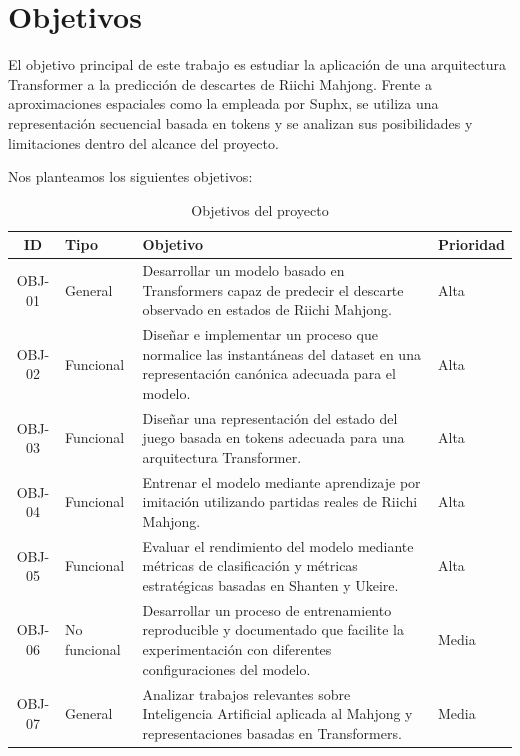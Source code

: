 \section{Objetivos}

El objetivo principal de este trabajo es estudiar la aplicación de una arquitectura Transformer a la predicción de descartes de Riichi Mahjong. Frente a aproximaciones espaciales como la empleada por Suphx\cite{li2020suphx}, se utiliza una representación secuencial basada en tokens y se analizan sus posibilidades y limitaciones dentro del alcance del proyecto.

Nos planteamos los siguientes objetivos:

\begin{table}[H]
\centering
\caption{Objetivos del proyecto}
\label{tab:objetivos}

\begin{tabular}{@{}cl p{8cm} l@{}}
\toprule
\textbf{ID} & \textbf{Tipo} & \textbf{Objetivo} & \textbf{Prioridad} \\
\midrule

OBJ-01 & General &
Desarrollar un modelo basado en Transformers capaz de predecir el descarte observado en estados de Riichi Mahjong. &
Alta \\

OBJ-02 & Funcional &
Diseñar e implementar un proceso que normalice las instantáneas del dataset en una representación canónica adecuada para el modelo. &
Alta \\

OBJ-03 & Funcional &
Diseñar una representación del estado del juego basada en tokens adecuada para una arquitectura Transformer. &
Alta \\

OBJ-04 & Funcional &
Entrenar el modelo mediante aprendizaje por imitación utilizando partidas reales de Riichi Mahjong. &
Alta \\

OBJ-05 & Funcional &
Evaluar el rendimiento del modelo mediante métricas de clasificación y métricas estratégicas basadas en Shanten y Ukeire. &
Alta \\

OBJ-06 & No funcional &
Desarrollar un proceso de entrenamiento reproducible y documentado que facilite la experimentación con diferentes configuraciones del modelo. &
Media \\

OBJ-07 & General &
Analizar trabajos relevantes sobre Inteligencia Artificial aplicada al Mahjong y representaciones basadas en Transformers. &
Media \\

\bottomrule
\end{tabular}

\end{table}

